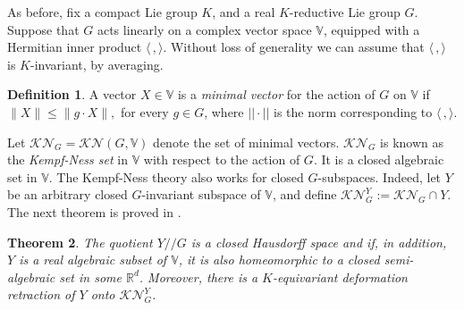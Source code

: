 \documentclass[a4paper,11pt,twoside]{article}
\newcounter{a}
\numberwithin{equation}{section}
\numberwithin{figure}{section}
\theoremstyle{plain}
\newtheorem{thm}{Theorem}[section]
\theoremstyle{definition}
\newtheorem{defn}[thm]{Definition}
\theoremstyle{remark}
\theoremstyle{plain}
\theoremstyle{plain}
\theoremstyle{plain}
\begin{document}
\label{sec:def-retract}As before, fix a compact Lie group $K$, and
a real $K$-reductive Lie group $G$. Suppose that $G$ acts linearly
on a complex vector space $\mathbb{V}$, equipped with a Hermitian
inner product ${\langle}\,,{\rangle}$. Without loss of generality we can
assume that ${\langle}\,,{\rangle}$ is $K$-invariant, by averaging.
\begin{defn}
A vector $X\in{\mathbb{V}}$ is a \emph{minimal vector} for the action of $G$
on ${\mathbb{V}}$ if \newline
 $\|X\|{\leqslant}\|g\cdot X\|,$
for every $g\in G$, where $||\cdot||$ is the norm corresponding
to ${\langle}\,,{\rangle}$.
\end{defn}

Let $\mathcal{KN}_{G}=\mathcal{KN}(G,{\mathbb{V}})$
denote the set of minimal vectors. $\mathcal{KN}_{G}$ is known as
the \emph{Kempf-Ness set} in ${\mathbb{V}}$ with respect to the action of
$G$. It is a closed algebraic set in $\mathbb{V}$.
The Kempf-Ness theory also works for closed $G$-subspaces. Indeed, let
$Y$ be an arbitrary closed $G$-invariant subspace of ${\mathbb{V}}$, and 
define $
\mathcal{KN}_{G}^{Y}:=\mathcal{KN}_{G}\cap Y.$
The next theorem is proved in \cite[Proposition 7.4, Theorems 7.6, 7.7 and 9.1]{rich-slod:1990}.
\begin{thm}
\label{thm:RS} The quotient $Y{/\!\!/} G$ is a closed Hausdorff space and if, in addition, $Y$ is a real algebraic subset of ${\mathbb{V}}$, it is also homeomorphic to a closed semi-algebraic set in some $\mathbb{R}^{d}$. Moreover, there is a $K$-equivariant deformation retraction of $Y$ onto $\mathcal{KN}_{G}^{Y}$.
\end{thm}
\end{document}

